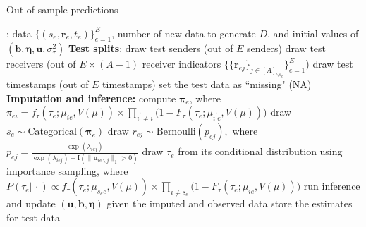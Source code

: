 \documentclass[ba]{imsart}
\def\spacingset#1{\renewcommand{\baselinestretch}%
	{#1}\small\normalsize} \spacingset{1}
\numberwithin{equation}{section}
\theoremstyle{plain}
\begin{document}
	\begin{algorithm}[!t]
		\spacingset{1}
		\caption{Out-of-sample predictions}
		\label{alg:PPE}
		\begin{algorithmic}
			: data $ \{ (s_e, \boldsymbol{r}_e, t_e)\}_{e=1}^E$, 
			number of new data to generate $D$, and initial values of $(\boldsymbol{b}, \boldsymbol{\eta}, \boldsymbol{u}, \sigma^2_\tau)$
			\vskip 0.1in
			\textbf{Test splits}:	
			\STATE draw test senders (out of $E$ senders) 
			\STATE draw test receivers (out of $E\times (A-1)$ receiver indicators $\{\{\boldsymbol{r}_{ej}\}_{j\in [A]_{\backslash s_e}}\}_{e=1}^E$)
			\STATE draw test timestamps  (out of $E$ timestamps) 
			\STATE set the test data as ``missing" (NA)
			\vskip 0.1in
			\textbf{Imputation and inference:}	
			\STATE compute $\boldsymbol{\pi}_e$, where $\pi_{ei}=f_{\tau}(\tau_{e}; \mu_{ie}, V(\mu))\times \prod_{i^\prime\neq i}\big(1-F_{\tau}(\tau_{e}; \mu_{i^\prime e}, V(\mu)) \big)$
			\STATE draw $s_e \sim \mbox{Categorical}(\boldsymbol{\pi}_e)$ 
			\ENDIF
			\STATE draw $r_{ej} \sim \mbox{Bernoulli}(p_{ej}),$
			where $p_{ej}=\frac{\exp(\lambda_{iej})}{\exp(\lambda_{iej})+\text{I}(\lVert\boldsymbol{u}_{ie\backslash j}\rVert_1 > 0 )}$ %
			\ENDIF
			\ENDFOR
			\STATE draw ${\tau}_e$ from its conditional distribution using importance sampling, %
	      where $P({\tau}_e|\, \cdot)\propto f_{\tau}(\tau_{e}; \mu_{s_e e}, V(\mu))\times \prod_{i\neq s_e}\big(1-F_{\tau}(\tau_{e}; \mu_{ie}, V(\mu)) \big)$%
			\ENDIF
			\STATE run inference and update $(\boldsymbol{u},\boldsymbol{b}, \boldsymbol{\eta})$ given the imputed and observed data
			\ENDFOR
			\STATE store the estimates for test data
			\ENDFOR
		\end{algorithmic}
	\end{algorithm}
	
\end{document}
